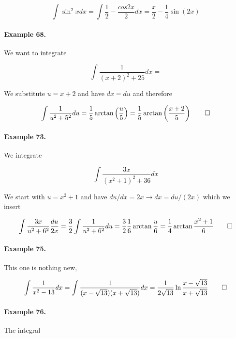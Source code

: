 \begin{equation*}
    \int \sin^2 x dx = \int \frac{1}{2} - \frac{cos 2x}{2} dx = \frac{x}{2} - \frac{1}{4} \sin(2x)
\end{equation*}

\paragraph{Example 68.} We want to integrate

\begin{equation*}
    \int \frac{1}{(x+2)^2 + 25} dx = 
\end{equation*}

We substitute $u = x+2$ and have $dx = du$ and therefore

\begin{equation*}
    \int \frac{1}{u^2 + 5^2} du = \frac{1}{5} \arctan \left( \frac{u}{5} \right) = \frac{1}{5} \arctan \left( \frac{x+2}{5} \right) \qed
\end{equation*}

\paragraph{Example 73.} We integrate

\begin{equation*}
    \int \frac{3x}{(x^2 + 1)^2 + 36} dx
\end{equation*}

We start with $u = x^2 + 1$ and have $du/dx = 2x \rightarrow dx = du/(2x)$ which we insert

\begin{equation*}
    \int \frac{3x}{u^2 + 6^2} \frac{du}{2x} = \frac{3}{2} \int \frac{1}{u^2 + 6^2} du = \frac{3}{2} \frac{1}{6} \arctan \frac{u}{6} = \frac{1}{4} \arctan \frac{x^2 + 1}{6} \qed
\end{equation*}

\paragraph{Example 75.} This one is nothing new,

\begin{equation*}
    \int \frac{1}{x^2 - 13} dx = \int \frac{1}{(x - \sqrt{13})(x + \sqrt{13}) } dx = \frac{1}{2 \sqrt{13}} \ln \frac{x - \sqrt{13}}{x + \sqrt{13}} \qed
\end{equation*}

\paragraph{Example 76.} The integral

